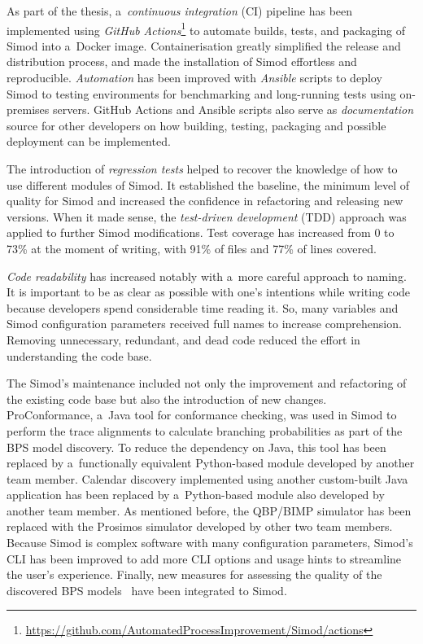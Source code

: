 \documentclass[12pt]{article}
\begin{document}
As part of the thesis, a~\emph{continuous integration} (CI) pipeline has been implemented using \emph{GitHub Actions}\footnote{\href{https://github.com/AutomatedProcessImprovement/Simod/actions}{https://github.com/AutomatedProcessImprovement/Simod/actions}} to automate builds, tests, and packaging of Simod into a~Docker image.
Containerisation greatly simplified the release and distribution process, and made the installation of Simod effortless and reproducible.
\emph{Automation} has been improved with \emph{Ansible} scripts to deploy Simod to testing environments for benchmarking and long-running tests using on-premises servers. 
GitHub Actions and Ansible scripts also serve as \emph{documentation} source for other developers on how building, testing, packaging and possible deployment can be implemented.

The introduction of \emph{regression tests} helped to recover the knowledge of how to use different modules of Simod. It established the baseline, the minimum level of quality for Simod and increased the confidence in refactoring and releasing new versions. When it made sense, the \emph{test-driven development} (TDD) approach was applied to further Simod modifications. Test coverage has increased from 0 to 73\% at the moment of writing, with 91\% of files and 77\% of lines covered.

\emph{Code readability} has increased notably with a~more careful approach to naming. It is important to be as clear as possible with one's intentions while writing code because developers spend considerable time reading it. So, many variables and Simod configuration parameters received full names to increase comprehension. Removing unnecessary, redundant, and dead code reduced the effort in understanding the code base.

The Simod's maintenance included not only the improvement and refactoring of the existing code base but also the introduction of new changes.
ProConformance, a~Java tool for conformance checking, was used in Simod to perform the trace alignments to calculate branching probabilities as part of the BPS model discovery.
To reduce the dependency on Java, this tool has been replaced by a~functionally equivalent Python-based module developed by another team member.
Calendar discovery implemented using another custom-built Java application has been replaced by a~Python-based module also developed by another team member.
As mentioned before, the QBP/BIMP simulator has been replaced with the Prosimos simulator developed by other two team members.
Because Simod is complex software with many configuration parameters, Simod's CLI has been improved to add more CLI options and usage hints to streamline the user's experience.
Finally, new measures for assessing the quality of the discovered BPS models~\cite{DBLP:journals/corr/abs-2303-17463} have been integrated to Simod.
\end{document}
